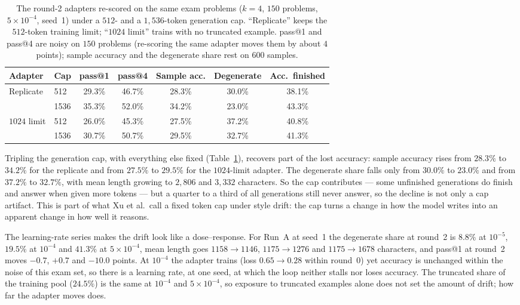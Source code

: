 \documentclass[runningheads]{llncs}
\begin{document}
\begin{table}[t]
\caption{The round-2 adapters re-scored on the same exam problems ($k=4$,
$150$ problems, $5\times10^{-4}$, seed~1) under a $512$- and a $1{,}536$-token
generation cap. ``Replicate'' keeps the $512$-token training limit;
``$1024$ limit'' trains with no truncated example. pass@1 and pass@4 are noisy
on $150$ problems (re-scoring the same adapter moves them by about $4$ points);
sample accuracy and the degenerate share rest on $600$ samples.}
\label{tab:reeval}
\centering
\setlength{\tabcolsep}{5pt}
\begin{tabular}{llccccc}
\toprule
Adapter & Cap & pass@1 & pass@4 & Sample acc. & Degenerate & Acc.\ finished \\
\midrule
Replicate     & 512  & 29.3\% & 46.7\% & 28.3\% & 30.0\% & 38.1\% \\
              & 1536 & 35.3\% & 52.0\% & 34.2\% & 23.0\% & 43.3\% \\
$1024$ limit  & 512  & 26.0\% & 45.3\% & 27.5\% & 37.2\% & 40.8\% \\
              & 1536 & 30.7\% & 50.7\% & 29.5\% & 32.7\% & 41.3\% \\
\bottomrule
\end{tabular}
\end{table}

Tripling the generation cap, with everything else fixed
(Table~\ref{tab:reeval}), recovers part of the lost accuracy: sample accuracy
rises from $28.3\%$ to $34.2\%$ for the replicate and from $27.5\%$ to $29.5\%$
for the $1024$-limit adapter. The degenerate share falls only from $30.0\%$ to
$23.0\%$ and from $37.2\%$ to $32.7\%$, with mean length growing to $2{,}806$ and
$3{,}332$ characters. So the cap contributes --- some unfinished generations do
finish and answer when given more tokens --- but a quarter to a third of all
generations still never answer, so the decline is not only a cap artifact.
This is part of what Xu et al.\ call a fixed
token cap under style drift: the cap turns a change in how the model writes
into an apparent change in how well it reasons.

The learning-rate series makes the drift look like a dose--response. For Run~A
at seed~1 the degenerate share at round~2 is $8.8\%$ at $10^{-5}$, $19.5\%$ at
$10^{-4}$ and $41.3\%$ at $5\times10^{-4}$, mean length goes $1158\to1146$,
$1175\to1276$ and $1175\to1678$ characters, and pass@1 at round~2 moves
$-0.7$, $+0.7$ and $-10.0$ points. At $10^{-4}$ the adapter trains (loss
$0.65\to0.28$ within round~0) yet accuracy is unchanged within the noise of
this exam set, so there is a learning rate, at one seed, at which the loop
neither stalls nor loses accuracy. The truncated share of the training pool
($24.5\%$) is the same at $10^{-4}$ and $5\times10^{-4}$, so exposure to
truncated examples alone does not set the amount of drift; how far the
adapter moves does.
\end{document}
